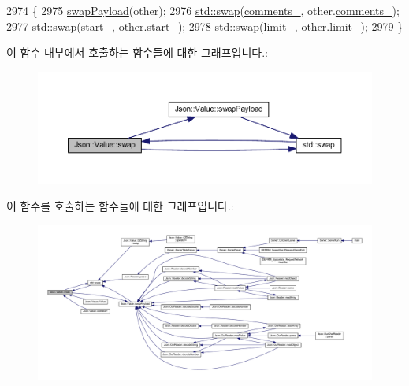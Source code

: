 \begin{DoxyCode}
2974                              \{
2975   \hyperlink{class_json_1_1_value_a5263476047f20e2fc6de470e4de34fe5}{swapPayload}(other);
2976   \hyperlink{namespacestd_a22cc6fcbbb1f2f705c7888b615e43582}{std::swap}(\hyperlink{class_json_1_1_value_a2016564cabc7a29208e97bd0b782a4e4}{comments\_}, other.\hyperlink{class_json_1_1_value_a2016564cabc7a29208e97bd0b782a4e4}{comments\_});
2977   \hyperlink{namespacestd_a22cc6fcbbb1f2f705c7888b615e43582}{std::swap}(\hyperlink{class_json_1_1_value_a1c3aeb0fa8fefe93776cb347c76a25a8}{start\_}, other.\hyperlink{class_json_1_1_value_a1c3aeb0fa8fefe93776cb347c76a25a8}{start\_});
2978   \hyperlink{namespacestd_a22cc6fcbbb1f2f705c7888b615e43582}{std::swap}(\hyperlink{class_json_1_1_value_afe377e25f6d3b5b8ea7221c84f29412a}{limit\_}, other.\hyperlink{class_json_1_1_value_afe377e25f6d3b5b8ea7221c84f29412a}{limit\_});
2979 \}
\end{DoxyCode}
이 함수 내부에서 호출하는 함수들에 대한 그래프입니다.\+:\nopagebreak
\begin{figure}[H]
\begin{center}
\leavevmode
\includegraphics[width=350pt]{class_json_1_1_value_aab841120d78e296e1bc06a373345e822_cgraph}
\end{center}
\end{figure}
이 함수를 호출하는 함수들에 대한 그래프입니다.\+:\nopagebreak
\begin{figure}[H]
\begin{center}
\leavevmode
\includegraphics[width=350pt]{class_json_1_1_value_aab841120d78e296e1bc06a373345e822_icgraph}
\end{center}
\end{figure}
\mbox{\label{class_json_1_1_value_a5263476047f20e2fc6de470e4de34fe5}} 
